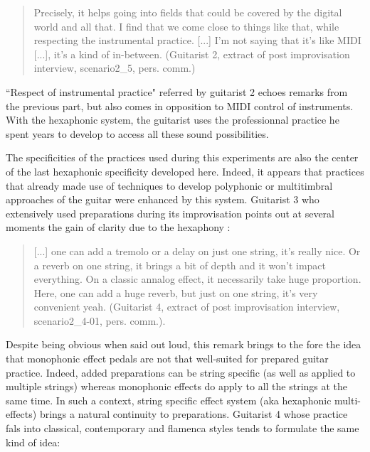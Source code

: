 \documentclass{article}
\begin{document}
\begin{quote}
Precisely, it helps going into fields that could be covered by the digital world and all that.  I find that we come close to things like that, while respecting the instrumental practice.  [...] I'm not saying that it's like MIDI [...], it's a kind of in-between.  (Guitarist 2, extract of post improvisation interview, scenario2\_5, pers. comm.)
\end{quote}

``Respect of instrumental practice" referred by guitarist 2 echoes remarks from the previous part, but also comes in opposition to MIDI control of instruments. With the hexaphonic system, the guitarist uses the professionnal practice he spent years to develop to access all these sound possibilities.

The specificities of the practices used during this experiments are also the center of the last hexaphonic specificity developed here. Indeed, it appears that practices that already made use of techniques to develop polyphonic or multitimbral approaches of the guitar were enhanced by this system. 
Guitarist 3 who extensively used preparations during its improvisation points out at several moments the gain of clarity due to the hexaphony : 

\begin{quote}
[...] one can add a tremolo or a delay on just one string, it's really nice. Or a reverb on one string, it brings a bit of depth and it won't impact everything. On a classic annalog effect, it necessarily take huge proportion. Here, one can add a huge reverb, but just on one string, it's very convenient yeah. (Guitarist 4, extract of post improvisation interview, scenario2\_4-01, pers. comm.).
\end{quote}

Despite being obvious when said out loud, this remark brings to the fore the idea that monophonic effect pedals are not that well-suited for prepared guitar practice. Indeed, added preparations can be string specific (as well as applied to multiple strings) whereas monophonic effects do apply to all the strings at the same time.
In such a context, string specific effect system (aka hexaphonic multi-effects) brings a natural continuity to preparations.
Guitarist 4 whose practice fals into classical, contemporary and flamenca styles tends to formulate the same kind of idea: 
\end{document}

